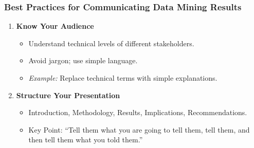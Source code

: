 \documentclass[aspectratio=169]{beamer}
\begin{document}
\begin{frame}[fragile]
    \frametitle{Best Practices for Communicating Data Mining Results}
    \begin{enumerate}
        \item \textbf{Know Your Audience}
            \begin{itemize}
                \item Understand technical levels of different stakeholders.
                \item Avoid jargon; use simple language.
                \item \textit{Example:} Replace technical terms with simple explanations.
            \end{itemize}

        \item \textbf{Structure Your Presentation}
            \begin{itemize}
                \item Introduction, Methodology, Results, Implications, Recommendations.
                \item Key Point: “Tell them what you are going to tell them, tell them, and then tell them what you told them.”
            \end{itemize}
    \end{enumerate}
\end{frame}
\end{document}
